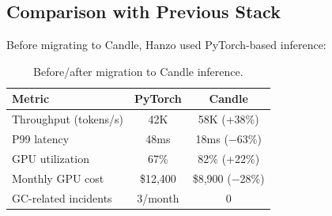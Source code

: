\subsection{Comparison with Previous Stack}

Before migrating to Candle, Hanzo used PyTorch-based inference:

\begin{table}[H]
\centering
\small
\begin{tabular}{lcc}
\toprule
\textbf{Metric} & \textbf{PyTorch} & \textbf{Candle} \\
\midrule
Throughput (tokens/s) & 42K & 58K (+38\%) \\
P99 latency & 48ms & 18ms ($-$63\%) \\
GPU utilization & 67\% & 82\% (+22\%) \\
Monthly GPU cost & \$12,400 & \$8,900 ($-$28\%) \\
GC-related incidents & 3/month & 0 \\
\bottomrule
\end{tabular}
\caption{Before/after migration to Candle inference.}
\label{tab:migration}
\end{table}

